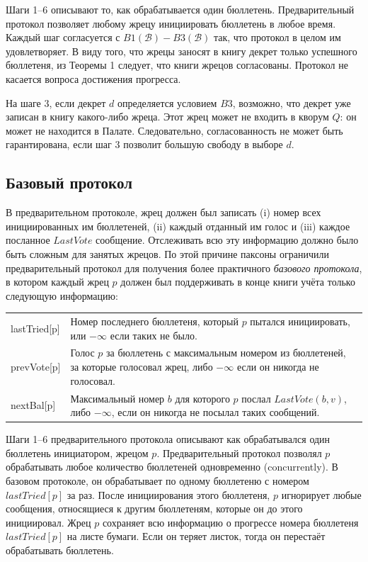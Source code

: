 \documentclass[12pt, a4paper]{article} %
\begin{document}
Шаги 1--6 описывают то, как обрабатывается один бюллетень. Предварительный протокол позволяет любому жрецу инициировать бюллетень в любое время. Каждый шаг согласуется с $B1(\mathcal{B}) - B3(\mathcal{B})$ так, что протокол в целом им удовлетворяет. В виду того, что жрецы заносят в книгу декрет только успешного бюллетеня, из Теоремы 1 следует, что книги жрецов согласованы. Протокол не касается вопроса достижения прогресса.

На шаге 3, если декрет $d$ определяется условием $B3$, возможно, что декрет уже записан в книгу какого-либо жреца. Этот жрец может не входить в кворум $Q$: он может не находится в Палате. Следовательно, согласованность не может быть гарантирована, если шаг 3 позволит большую свободу в выборе $d$.

\subsection{Базовый протокол}\label{sec:basicprot}

В предварительном протоколе, жрец должен был записать (i) номер всех инициированных им бюллетеней, (ii) каждый отданный им голос и (iii) каждое посланное $LastVote$ сообщение. Отслеживать всю эту информацию должно было быть сложным для занятых жрецов. По этой причине паксоны ограничили предварительный протокол для получения более практичного \textit{базового протокола}, в котором каждый жрец $p$ должен был поддерживать в конце книги учёта только следующую информацию:
\begin{table}[h]
\begin{tabular}{l p{9.5cm}}
    lastTried[p] &Номер последнего бюллетеня, который $p$ пытался инициировать, или $-\infty$ если таких не было.\\
    prevVote[p] & Голос $p$ за бюллетень с максимальным номером из бюллетеней, за которые голосовал жрец, либо $-\infty$ если он никогда не голосовал.\\
    nextBal[p] &  Максимальный номер $b$ для которого $p$ послал $LastVote(b, v)$, либо $-\infty$, если он никогда не посылал таких сообщений.
\end{tabular}
\end{table}



Шаги 1--6 предварительного протокола описывают как обрабатывался один бюллетень инициатором, жрецом $p$. Предварительный протокол позволял $p$ обрабатывать любое количество бюллетеней одновременно (concurrently). В базовом протоколе, он обрабатывает по одному бюллетеню с номером $lastTried[p]$ за раз. После инициирования этого бюллетеня, $p$ игнорирует любые сообщения, относящиеся к другим бюллетеням, которые он до этого инициировал. Жрец $p$ сохраняет всю информацию о прогрессе номера бюллетеня $lastTried[p]$ на листе бумаги. Если он теряет листок, тогда он перестаёт обрабатывать бюллетень.
\end{document}
